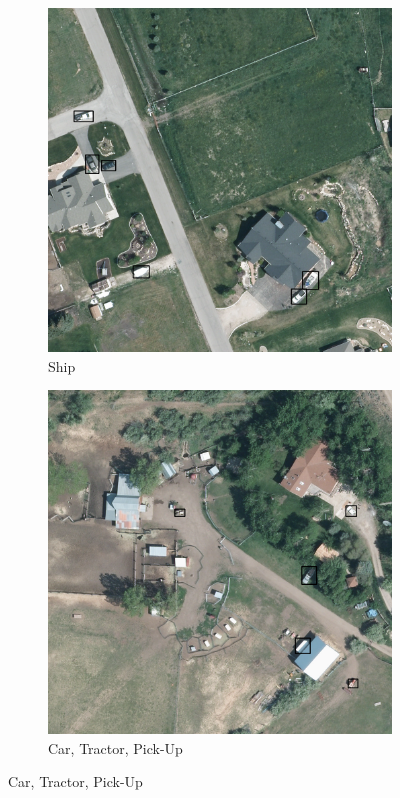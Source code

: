 \begin{figure}[h!]
    \begin{subfigure}[t]{0.38\textwidth}
        \centering
        \includegraphics[width=\linewidth]{images/015Results/01abb_vs_obb/comp_images/ground_truth_abb/509.png}
        \caption{Ship}
    \end{subfigure}
    \begin{subfigure}[t]{0.38\textwidth}
        \centering
        \includegraphics[width=\linewidth]{images/015Results/01abb_vs_obb/comp_images/ground_truth_abb/523.png}
        \caption{Car, Tractor, Pick-Up}
    \end{subfigure}
    

\end{figure}
